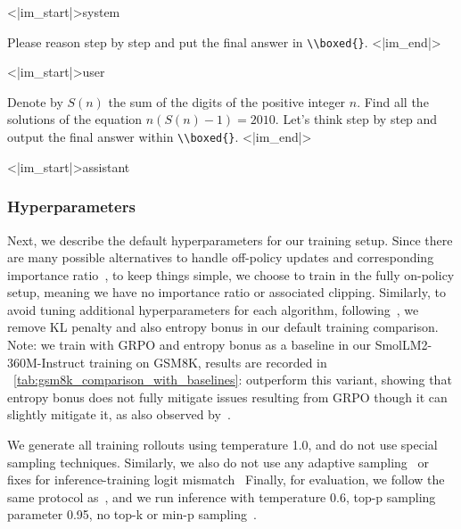 \documentclass[10pt]{article} %
\begin{document}
\begin{tcolorbox}[
    colback=cyan!5,       
    colframe=cyan!50!blue, 
    coltext=black,
    coltitle=white,
  title={Qwen Math Prompt Template},
  fonttitle=\small\bfseries,
  boxrule=0.4pt,
  arc=2mm,
  left=4pt,
  right=4pt,
  top=4pt,
  bottom=4pt
]
\label{box:qwen-math-prompts}

{\ttfamily\small
<|im\_start|>system
}

{\ttfamily\small
Please reason step by step and put the final answer in \texttt{\textbackslash \textbackslash boxed\{\}}. <|im\_end|>
}

{\ttfamily\small
<|im\_start|>user
}

{\ttfamily\small
 Denote by $S(n)$ the sum of the digits of the positive integer $n$. Find all the solutions of the equation $n(S(n)-1)=2010$. Let's think step by step and output the final answer within \texttt{\textbackslash \textbackslash boxed\{\}}. <|im\_end|>
}

{\ttfamily\small
<|im\_start|>assistant
}

\end{tcolorbox}

\subsubsection{Hyperparameters}

Next, we describe the default hyperparameters for our training setup. Since there are many possible alternatives to handle off-policy updates and corresponding importance ratio~\citep{schulman2017proximalpolicyoptimizationalgorithms,shao2024deepseekmathpushinglimitsmathematical,zheng2025groupsequencepolicyoptimization,minimax2025minimaxm1scalingtesttimecompute,yu2025dapoopensourcellmreinforcement}, to keep things simple, we choose to train in the fully on-policy setup, meaning we have no importance ratio or associated clipping. Similarly, to avoid tuning additional hyperparameters for each algorithm, following~\citet{olmo2025olmo3}, we remove KL penalty and also entropy bonus in our default training comparison. Note: we train with GRPO and entropy bonus as a baseline in our SmolLM2-360M-Instruct training on GSM8K, results are recorded in ~\cref{tab:gsm8k_comparison_with_baselines}: \ours{} outperform this variant, showing that entropy bonus does not fully mitigate issues resulting from GRPO though it can slightly mitigate it, as also observed by~\citet{yue2025doesreinforcementlearningreally}. 

We generate all training rollouts using temperature 1.0, and do not use special sampling techniques. Similarly, we also do not use any adaptive sampling~\citep{yu2025dapoopensourcellmreinforcement} or fixes for inference-training logit mismatch~\citep{he2025defeating,khatri2025artscalingreinforcementlearning} Finally, for evaluation, we follow the same protocol as~\citet{yue2025doesreinforcementlearningreally}, and we run inference with temperature 0.6, top-p sampling parameter 0.95, no top-k or min-p sampling~\citep{nguyen2025turningheatminpsampling}.
\end{document}
